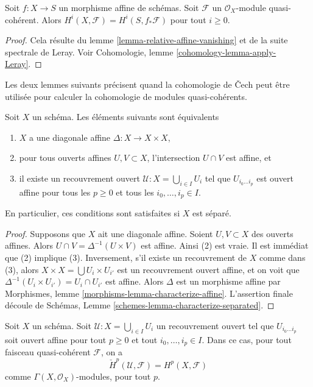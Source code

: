 \begin{lemma}
\label{lemma-relative-affine-cohomology}
Soit $f : X \to S$ un morphisme affine de schémas.
Soit $\mathcal{F}$ un $\mathcal{O}_X$-module quasi-cohérent.
Alors $H^i(X, \mathcal{F}) = H^i(S, f_*\mathcal{F})$ pour tout $i \geq 0$.
\end{lemma}

\begin{proof}
Cela résulte du lemme \ref{lemma-relative-affine-vanishing}
et de la suite spectrale de Leray. Voir
Cohomologie, lemme \ref{cohomology-lemma-apply-Leray}.
\end{proof}

\noindent
Les deux lemmes suivants précisent quand la cohomologie de {\v C}ech peut
être utilisée pour calculer la cohomologie de modules quasi-cohérents.

\begin{lemma}
\label{lemma-affine-diagonal}
Soit $X$ un schéma. Les éléments suivants sont équivalents
\begin{enumerate}
\item $X$ a une diagonale affine $\Delta : X \to X \times X$,
\item pour tous ouverts affines $U, V \subset X$, l'intersection
$U \cap V$ est affine, et
\item il existe un recouvrement ouvert $\mathcal{U} : X = \bigcup_{i \in I} U_i$
tel que $U_{i_0 \ldots i_p}$ est ouvert affine pour tous les $p \ge 0$ et tous les
$i_0, \ldots, i_p \in I$.
\end{enumerate}
En particulier, ces conditions sont satisfaites si $X$ est séparé.
\end{lemma}

\begin{proof}
Supposons que $X$ ait une diagonale affine. Soient $U, V \subset X$ des ouverts affines.
Alors $U \cap V = \Delta^{-1}(U \times V)$ est affine. Ainsi (2) est
vraie. Il est immédiat que (2) implique (3). Inversement, s'il existe un
recouvrement de $X$ comme dans (3), alors $X \times X = \bigcup U_i \times U_{i'}$
est un recouvrement ouvert affine, et on voit que
$\Delta^{-1}(U_i \times U_{i'}) = U_i \cap U_{i'}$
est affine. Alors $\Delta$ est un morphisme affine par
Morphismes, lemme \ref{morphisms-lemma-characterize-affine}.
L'assertion finale découle de Schémas, Lemme
\ref{schemes-lemma-characterize-separated}.
\end{proof}

\begin{lemma}
\label{lemma-cech-cohomology-quasi-coherent}
Soit $X$ un schéma.
Soit $\mathcal{U} : X = \bigcup_{i \in I} U_i$ un recouvrement ouvert tel que
$U_{i_0 \ldots i_p}$ soit ouvert affine pour tout $p \ge 0$ et tout
$i_0, \ldots, i_p \in I$.
Dans ce cas, pour tout faisceau quasi-cohérent $\mathcal{F}$, on a
$$
\check{H}^p(\mathcal{U}, \mathcal{F}) = H^p(X, \mathcal{F})
$$
comme $\Gamma(X, \mathcal{O}_X)$-modules, pour tout $p$.
\end{lemma}

